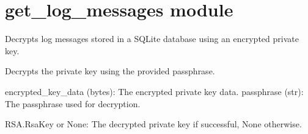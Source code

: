 \documentclass[letterpaper,10pt,english]{sphinxmanual}
\begin{document}
\sphinxstepscope


\section{get\_log\_messages module}
\label{\detokenize{get_log_messages:module-get_log_messages}}\label{\detokenize{get_log_messages:get-log-messages-module}}\label{\detokenize{get_log_messages::doc}}

\begin{fulllineitems}
\label{\detokenize{get_log_messages:get_log_messages.decrypt_log_messages}}
\pysigstartsignatures
{}
\pysigstopsignatures
\sphinxAtStartPar
Decrypts log messages stored in a SQLite database using an encrypted private key.

\end{fulllineitems}


\begin{fulllineitems}
\label{\detokenize{get_log_messages:get_log_messages.decrypt_private_key}}
\pysigstartsignatures
{}
\pysigstopsignatures
\sphinxAtStartPar
Decrypts the private key using the provided passphrase.
\begin{description}
\sphinxAtStartPar
encrypted\_key\_data (bytes): The encrypted private key data.
passphrase (str): The passphrase used for decryption.

\sphinxAtStartPar
RSA.RsaKey or None: The decrypted private key if successful, None otherwise.

\end{description}

\end{fulllineitems}
\end{document}
